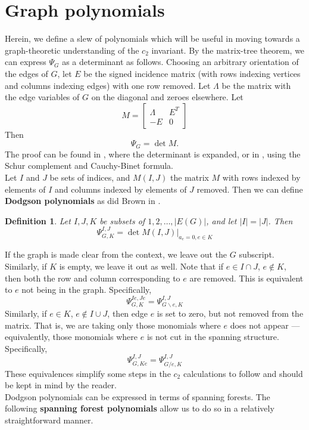 \documentclass[12pt]{amsart}
\newtheorem{definition}{Definition}
\numberwithin{definition}{section}
\begin{document}
\section{Graph polynomials}
Herein, we define a slew of polynomials which will be useful in moving towards a graph-theoretic understanding of the $c_2$ invariant. By the matrix-tree theorem, we can express $\Psi_G$ as a determinant as follows. Choosing an arbitrary orientation of the edges of $G$, let $E$ be the signed incidence matrix (with rows indexing vertices and columns indexing edges) with one row removed. Let $\Lambda$ be the matrix with the edge variables of $G$ on the diagonal and zeroes elsewhere. Let 
\[M=\begin{bmatrix}
\Lambda & E^T \\
-E & 0
\end{bmatrix}\]
Then 
\[\Psi_G=\det M.\]
The proof can be found in \cite{Brown2009}, where the determinant is expanded, or in \cite{VlasevYeats2012}, using the Schur complement and Cauchy-Binet formula. \\
Let $I$ and $J$ be sets of indices, and $M(I,J)$ the matrix $M$ with rows indexed by elements of $I$ and columns indexed by elements of $J$ removed. Then we can define \textbf{Dodgson polynomials} as did Brown in \cite{Brown2009}.\\
\begin{definition}
	Let $I,J,K$ be subsets of ${1,2,\dots,|E(G)|}$, and let $|I|=|J|$. Then
	\[\Psi_{G,K}^{I,J}=\det M(I,J)|_{a_e=0, e\in K}\]
\end{definition}
If the graph is made clear from the context, we leave out the $G$ subscript. Similarly, if $K$ is empty, we leave it out as well. Note that if $e\in I\cap J$, $e\not\in K$, then both the row and column corresponding to $e$ are removed. This is equivalent to $e$ not being in the graph. Specifically,
\[\Psi_{G,K}^{Ie,Je}=\Psi_{G\backslash e, K}^{I,J}\]
Similarly, if $e\in K$, $e\not\in I\cup J$, then edge $e$ is set to zero, but not removed from the matrix. That is, we are taking only those monomials where $e$ does not appear --- equivalently, those monomials where $e$ is not cut in the spanning structure. Specifically, 
\[\Psi_{G,Ke}^{I,J}=\Psi_{G/e,K}^{I,J}\]
These equivalences simplify some steps in the $c_2$ calculations to follow and should be kept in mind by the reader. \\
Dodgson polynomials can be expressed in terms of spanning forests. The following \textbf{spanning forest polynomials} allow us to do so in a relatively straightforward manner. 
\end{document}
